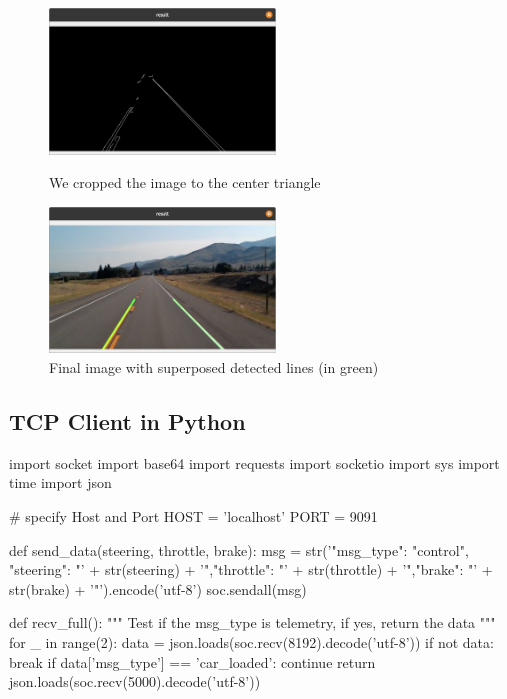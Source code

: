 \begin{appendices}
\begin{figure}[!h]
\begin{minipage}{7cm}
\centering
\includegraphics[width=6cm]{img/lane_detect/cropped_img.png}
\caption{We cropped the image to the center triangle}
\end{minipage}
\hspace*{1cm}
\begin{minipage}{7cm}
\centering
\includegraphics[width=6cm]{img/lane_detect/combo_img.png}
\caption{Final image with superposed detected lines (in green)}
\end{minipage}
\end{figure}

\clearpage
\subsection{TCP Client in Python}
\label{TCPClient}
\begin{python}
import socket
import base64
import requests
import socketio
import sys
import time
import json


# specify Host and Port
HOST = 'localhost'
PORT = 9091


def send_data(steering, throttle, brake):
    msg = str('{"msg_type": "control", "steering": "' +
              str(steering) + '","throttle": "' + str(throttle) +
              '","brake": "' + str(brake) + '"}').encode('utf-8')
    soc.sendall(msg)


def recv_full():
    """
    Test if the msg_type is telemetry, if yes, return the data
    """
    for _ in range(2):
        data = json.loads(soc.recv(8192).decode('utf-8'))
        if not data:
            break
        if data['msg_type'] == 'car_loaded':
            continue
        return json.loads(soc.recv(5000).decode('utf-8'))



\end{python}
\end{appendices}
